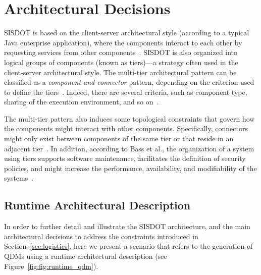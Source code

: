 \section{Architectural Decisions}
\label{sec:architecture} 

SISDOT is based on the client-server architectural style (according to 
a typical Java enterprise application), where the components interact to each other by requesting 
services from other components~\cite{clements2011documenting}. 
SISDOT is also organized into logical groups of 
components (known as tiers)---a strategy often used in the 
client-server architectural style. The multi-tier architectural pattern 
can be classified as a \emph{component and connector} pattern, 
depending on the criterion used to define the tiers~\cite{bass2013software}. 
Indeed, there are several criteria, such as component type, sharing of the execution environment, 
and so on~\cite{clements2011documenting}.

The multi-tier pattern also induces some topological constraints 
that govern how the components might interact with other components. 
Specifically, connectors might only exist 
between components of the same tier or that reside in an adjacent 
tier~\cite{clements2011documenting}. In addition, according to Bass et al., 
the organization of a system using tiers supports software maintenance, facilitates the definition of 
security policies, and might increase the performance, availability, and modifiability of 
the systems~\cite{bass2013software}. 


\subsection{Runtime Architectural Description}

In order to further detail and illustrate the SISDOT architecture, 
and the main architectural decisions to address the constraints introduced 
in Section~\ref{sec:logistics}, here we present a scenario that refers to the 
generation of QDMs using a runtime architectural 
description (see Figure~\ref{fig:fig:runtime_qdm}). 

